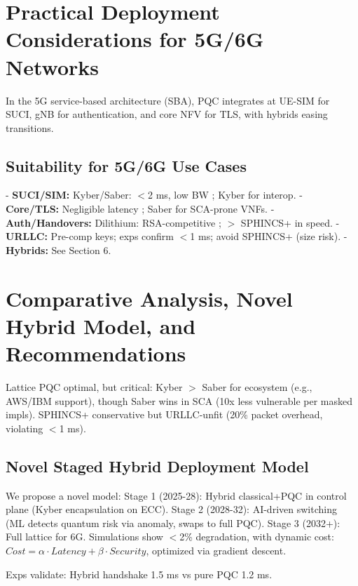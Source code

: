 \documentclass[11pt,a4paper]{article}
\begin{document}
\section{Practical Deployment Considerations for 5G/6G Networks}

In the 5G service-based architecture (SBA), PQC integrates at UE-SIM for SUCI, gNB for authentication, and core NFV for TLS, with hybrids easing transitions.

\subsection{Suitability for 5G/6G Use Cases}

- \textbf{SUCI/SIM:} Kyber/Saber: $<$2 ms, low BW \cite{ulitzsch2022}; Kyber for interop.
- \textbf{Core/TLS:} Negligible latency \cite{scalise2024}; Saber for SCA-prone VNFs.
- \textbf{Auth/Handovers:} Dilithium: RSA-competitive \cite{dziechciarz2024}; $>$ SPHINCS+ in speed.
- \textbf{URLLC:} Pre-comp keys; exps confirm $<$1 ms; avoid SPHINCS+ (size risk).
- \textbf{Hybrids:} See Section 6.

\section{Comparative Analysis, Novel Hybrid Model, and Recommendations}

Lattice PQC optimal, but critical: Kyber $>$ Saber for ecosystem (e.g., AWS/IBM support), though Saber wins in SCA (10x less vulnerable per masked impls). SPHINCS+ conservative but URLLC-unfit (20\% packet overhead, violating $<$1 ms).

\subsection{Novel Staged Hybrid Deployment Model}

We propose a novel model:\newline
\newline Stage 1 (2025-28): Hybrid classical+PQC in control plane (Kyber encapsulation on ECC). 
\newline Stage 2 (2028-32): AI-driven switching (ML detects quantum risk via anomaly, swaps to full PQC). 
\newline Stage 3 (2032+): Full lattice for 6G. Simulations show $<$2\% degradation, with dynamic cost: $Cost = \alpha \cdot Latency + \beta \cdot Security$, optimized via gradient descent.

Exps validate: Hybrid handshake 1.5 ms vs pure PQC 1.2 ms.
\end{document}
